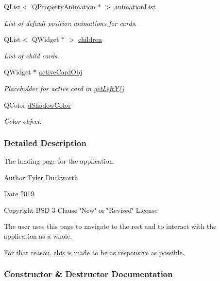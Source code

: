 \begin{DoxyCompactItemize}
Q\+List$<$ Q\+Property\+Animation $\ast$ $>$ \mbox{\hyperlink{classHomePage_afe801a94e5ae4b4f136a022bf3410411}{animation\+List}}
\begin{DoxyCompactList}\small\item\em List of default position animations for cards. \end{DoxyCompactList}\item 
Q\+List$<$ Q\+Widget $\ast$ $>$ \mbox{\hyperlink{classHomePage_a0f7d1602b0aa49fbea7693e921e8ab07}{children}}
\begin{DoxyCompactList}\small\item\em List of child cards. \end{DoxyCompactList}\item 
Q\+Widget $\ast$ \mbox{\hyperlink{classHomePage_a36a25c775874418af5e2777c91c3393e}{active\+Card\+Obj}}
\begin{DoxyCompactList}\small\item\em Placeholder for active card in \mbox{\hyperlink{classHomePage_a38c909855e6b1e1a0739642949aa4f9a}{get\+Left\+Y()}} \end{DoxyCompactList}\item 
Q\+Color \mbox{\hyperlink{classHomePage_aa32d795233f9dcc2783c1c68e3de19c9}{d\+Shadow\+Color}}
\begin{DoxyCompactList}\small\item\em Color object. \end{DoxyCompactList}\end{DoxyCompactItemize}


\subsubsection{Detailed Description}
The landing page for the application. 

\begin{DoxyAuthor}{Author}
Tyler Duckworth 
\end{DoxyAuthor}
\begin{DoxyDate}{Date}
2019 
\end{DoxyDate}
\begin{DoxyCopyright}{Copyright}
B\+SD 3-\/Clause \char`\"{}\+New\char`\"{} or \char`\"{}\+Revised\char`\"{} License
\end{DoxyCopyright}
The user uses this page to navigate to the rest and to interact with the application as a whole.

For that reason, this is made to be as responsive as possible. 

\subsubsection{Constructor \& Destructor Documentation}
\mbox{\label{classHomePage_a5a47924673356c09cc9269511e07fdf2}} 
